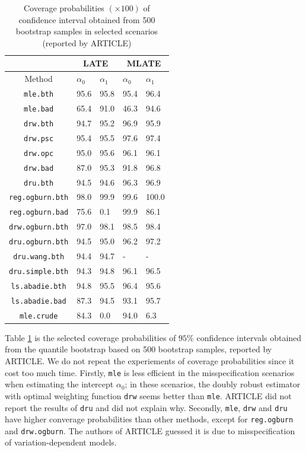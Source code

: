 \documentclass{article}
\begin{document}
\begin{table}
\footnotesize
\centering
\begin{tabular}[h]{c|p{2cm}<{\centering}p{2cm}<{\centering}|p{2cm}<{\centering}p{2cm}<{\centering}}
\toprule
  & \multicolumn{2}{c|}{LATE} &\multicolumn{2}{c}{MLATE}\\
\midrule
  Method & $\alpha_0$ & $\alpha_1$ & $\alpha_0$ & $\alpha_1$\\
\midrule
\texttt{mle.bth} & 95.6 & 95.8 & 95.4 & 96.4\\
\texttt{mle.bad} & 65.4 & 91.0 & 46.3 & 94.6\\
\texttt{drw.bth} & 94.7 & 95.2 & 96.9 & 95.9\\
\texttt{drw.psc} & 95.4 & 95.5 & 97.6 & 97.4\\
\texttt{drw.opc} & 95.0 & 95.6 & 96.1 & 96.1\\
\texttt{drw.bad} & 87.0 & 95.3 & 91.8 & 96.8\\
\texttt{dru.bth} & 94.5 & 94.6 & 96.3 & 96.9\\
\texttt{reg.ogburn.bth} & 98.0 & 99.9 & 99.6 & 100.0\\
\texttt{reg.ogburn.bad} & 75.6 & 0.1 & 99.9 & 86.1\\
\texttt{drw.ogburn.bth} & 97.0 & 98.1 & 98.5 & 98.4\\
\texttt{dru.ogburn.bth} & 94.5 & 95.0 & 96.2 & 97.2\\
\texttt{dru.wang.bth} & 94.4 & 94.7 & - & -\\
\texttt{dru.simple.bth} & 94.3 & 94.8 & 96.1 & 96.5\\
\texttt{ls.abadie.bth} & 94.8 & 95.5 & 96.4 & 95.6\\
\texttt{ls.abadie.bad} & 87.3 & 94.5 & 93.1 & 95.7\\
\texttt{mle.crude} & 84.3 & 0.0 & 94.0 & 6.3\\
\bottomrule
\end{tabular}
\caption{Coverage probabilities $(\times 100)$ of confidence interval obtained from 500 bootstrap samples in selected scenarios (reported by ARTICLE)}
\label{coverage}
\end{table}

Table \ref*{coverage} is the selected coverage probabilities of $95\%$ confidence intervals obtained from the quantile bootstrap based on 500 bootstrap samples, reported by ARTICLE. We do not repeat the experiements of coverage probabilities since it cost too much time. Firstly, \texttt{mle} is less efficient in the misspecification scenarios when estimating the intercept $\alpha_0$; in these scenarios, the doubly robust estimator with optimal weighting function \texttt{drw} seems better than \texttt{mle}. ARTICLE did not report the results of \texttt{dru} and did not explain why. Secondly, \texttt{mle}, \texttt{drw} and \texttt{dru} have higher converage probabilities than other methods, except for \texttt{reg.ogburn} and \texttt{drw.ogburn}. The authors of ARTICLE guessed it is due to misspecification of variation-dependent models.
\end{document}
